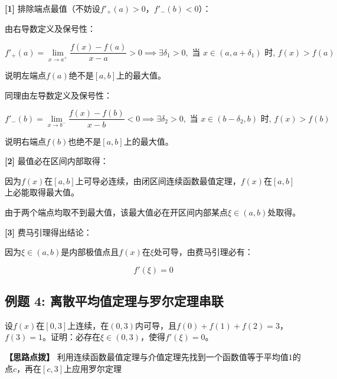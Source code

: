 \documentclass[11pt,a4paper,UTF8]{ctexart}
\begin{document}
\begin{solbox}[分步推导与答题规范]
\textbf{[1]} 排除端点最值（不妨设$f'_+(a) > 0$，$f'_-(b) < 0$）：

由右导数定义及保号性：


\begin{equation*}
f'_+(a) = \lim_{x \to a^+} \frac{f(x) - f(a)}{x - a} > 0 \implies \exists \delta_1 > 0, \text{ 当 } x \in (a, a+\delta_1) \text{ 时, } f(x) > f(a)
\end{equation*}


说明左端点$f(a)$绝不是$[a, b]$上的最大值。

同理由左导数定义及保号性：


\begin{equation*}
f'_-(b) = \lim_{x \to b^-} \frac{f(x) - f(b)}{x - b} < 0 \implies \exists \delta_2 > 0, \text{ 当 } x \in (b-\delta_2, b) \text{ 时, } f(x) > f(b)
\end{equation*}


说明右端点$f(b)$也绝不是$[a, b]$上的最大值。

\textbf{[2]} 最值必在区间内部取得：

因为$f(x)$在$[a, b]$上可导必连续，由闭区间连续函数最值定理，$f(x)$在$[a, b]$上必能取得最大值。

由于两个端点均取不到最大值，该最大值必在开区间内部某点$\xi \in (a, b)$处取得。

\textbf{[3]} 费马引理得出结论：

因为$\xi \in (a, b)$是内部极值点且$f(x)$在$\xi$处可导，由费马引理必有：


\begin{equation*}
f'(\xi) = 0
\end{equation*}

\end{solbox}


\subsection{例题 4: 离散平均值定理与罗尔定理串联}

设$f(x)$在$[0, 3]$上连续，在$(0, 3)$内可导，且$f(0) + f(1) + f(2) = 3$，$f(3) = 1$。证明：必存在$\xi \in (0, 3)$，使得$f'(\xi) = 0$。

\textbf{\color{DeepPurple}【思路点拨】} 利用连续函数最值定理与介值定理先找到一个函数值等于平均值$1$的点$c$，再在$[c, 3]$上应用罗尔定理
\end{document}
